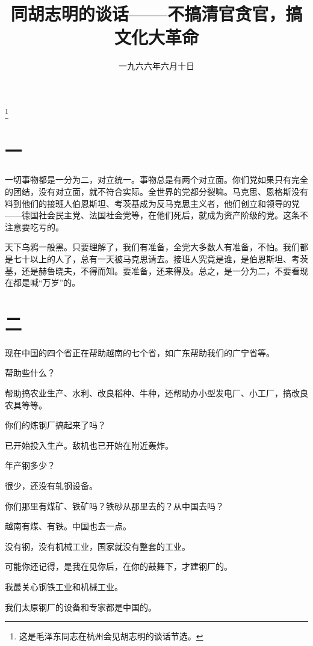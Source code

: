 
\title{同胡志明的谈话——不搞清官贪官，搞文化大革命}
\date{一九六六年六月十日}
\thanks{这是毛泽东同志在杭州会见胡志明的谈话节选。}
\maketitle


\section*{一}

一切事物都是一分为二，对立统一。事物总是有两个对立面。你们党如果只有完全的团结，没有对立面，就不符合实际。全世界的党都分裂嘛。马克思、恩格斯没有料到他们的接班人伯恩斯坦、考茨基成为反马克思主义者，他们创立和领导的党——德国社会民主党、法国社会党等，在他们死后，就成为资产阶级的党。这条不注意要吃亏的。

天下乌鸦一般黑。只要理解了，我们有准备，全党大多数人有准备，不怕。我们都是七十以上的人了，总有一天被马克思请去。接班人究竟是谁，是伯恩斯坦、考茨基，还是赫鲁晓夫，不得而知。要准备，还来得及。总之，是一分为二，不要看现在都是喊“万岁”的。

\section*{二}

现在中国的四个省正在帮助越南的七个省，如广东帮助我们的广宁省等。

帮助些什么？

帮助搞农业生产、水利、改良稻种、牛种，还帮助办小型发电厂、小工厂，搞改良农具等等。

你们的炼钢厂搞起来了吗？

已开始投入生产。敌机也已开始在附近轰炸。

年产钢多少？

很少，还没有轧钢设备。

你们那里有煤矿、铁矿吗？铁砂从那里去的？从中国去吗？

越南有煤、有铁。中国也去一点。

没有钢，没有机械工业，国家就没有整套的工业。

可能你还记得，是我在见你后，在你的鼓舞下，才建钢厂的。

我最关心钢铁工业和机械工业。

我们太原钢厂的设备和专家都是中国的。

